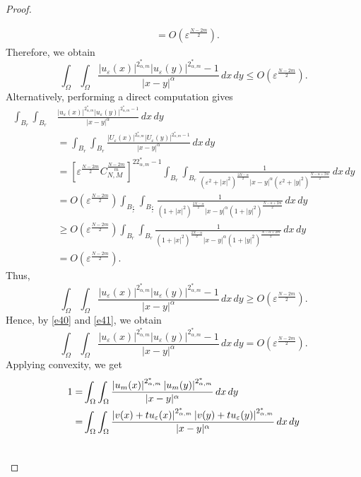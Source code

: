 \documentclass[reqno]{amsart}
\newcommand{\eps}{\varepsilon}
\newcommand{\Om}{\Omega}
\newcommand{\al} {\alpha}
\numberwithin{theorem}{section} \numberwithin{equation}{section}
\begin{document}
\begin{proof}
\begin{enumerate}
\begin{align*}
&=O\left(\eps^{\frac{N-2m}{2}}\right).
\end{align*}
Therefore, we obtain
\begin{equation} \label{e40}
\int_{\Om} \int_{\Om} \frac{\left|u_{\eps}(x)\right|^{2_{\al, m}^*}\left|u_{\eps}(y)\right|^{2_{\al, m}^*}-1}{|x-y|^\al} \, dx \, dy \leq O\left(\eps^{\frac{N-2m}{2}}\right).
\end{equation}
Alternatively, performing a direct computation gives
\begin{align*}
\int_{B_{r}} \int_{B_{r}} &\frac{|u_{\eps}(x)|^{2_{\al, m}^*}|u_{\eps}(y)|^{2_{\al, m}^*-1}}{|x-y|^\al} \, dx \, dy \\
& =\int_{B_{r}} \int_{B_{r}}  \frac{|U_{\eps}(x)|^{2_{\al, m}^*}|U_{\eps}(y)|^{2_{\al, m}^*-1}}{|x-y|^\al} \, dx \, dy \\
&=[\eps^{\frac{N-2m}{2}}C_{N,M}^{\frac{N-2m}{m}}]^{22_{\al, m}^*-1} \int_{B_{r}} \int_ {B_{r}}\frac{1}{({\eps}^2+|x|^2)^{\frac{2N-\al}{2}}|x-y|^\al({\eps}^2+|y|^2)^{\frac{N-\al+2m}{2}}} \, dx \, dy \\
&= O\left(\eps^{\frac{N-2m}{2}}\right) \int_{B_{\frac{r}{\eps}}} \int_ {B_{\frac{r}{\eps}}}\frac{1}{(1+|x|^2)^{\frac{2N-\al}{2}}|x-y|^\al(1+|y|^2)^{\frac{N-\al+2m}{2}}} \, dx \, dy \\ 
& \geq O\left(\eps^{\frac{N-2m}{2}}\right) \int_{B_{r}} \int_{B_{r}}
\frac{1}{(1+|x|^2)^{\frac{2N-\al}{2}}|x-y|^\al(1+|y|^2)^{\frac{N-\al+2m}{2}}} \, dx \, dy \\
&= O\left(\eps^{\frac{N-2m}{2}}\right).
\end{align*}
Thus,
\begin{equation} \label{e41}
\int_{\Om} \int_{\Om} \frac{\left|u_{\eps}(x)\right|^{2_{\al, m}^*}\left|u_{\eps}(y)\right|^{2_{\al, m}^*}-1}{|x-y|^\al} \, dx \, dy \geq O\left(\eps^{\frac{N-2m}{2}}\right).
\end{equation}
Hence, by \eqref{e40} and \eqref{e41}, we obtain
\[\int_{\Om} \int_{\Om} \frac{\left|u_{\eps}(x)\right|^{2_{\al, m}^*}\left|u_{\eps}(y)\right|^{2_{\al, m}^*}-1}{|x-y|^\al} \, dx \, dy =O\left(\eps^{\frac{N-2m}{2}}\right).\]
Applying convexity, we get
\begin{align} \label{e23} \notag
1= & \int_{\Om} \int_{\Om} \frac{\left|u_m(x)\right|^{2_{\al, m}^*}\left|u_m(y)\right|^{2_{\al, m}^*}}{|x-y|^\al} \, dx \, dy \\ \notag
= & \int_{\Om} \int_{\Om} \frac{\left|v(x)+t u_\eps(x)\right|^{2_{\al, m}^*}\left|v(y)+t u_\eps(y)\right|^{2_{\al, m}^*}}{|x-y|^\al} \, dx \, dy \\ \notag

\end{align}
\end{enumerate}
\end{proof}
\end{document}
